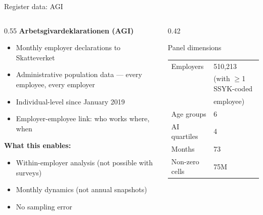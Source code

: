 \documentclass[aspectratio=169,11pt]{beamer}
\begin{document}
\begin{frame}{Register data: AGI}
\begin{columns}[T]
\begin{column}{0.55\textwidth}
\textbf{Arbetsgivardeklarationen (AGI)}
\begin{itemize}
    \item Monthly employer declarations to Skatteverket
    \item Administrative population data --- every employee, every employer
    \item Individual-level since January 2019
    \item Employer-employee link: who works where, when
\end{itemize}
\vspace{2mm}
\textbf{What this enables:}
\begin{itemize}
    \item Within-employer analysis (not possible with surveys)
    \item Monthly dynamics (not annual snapshots)
    \item No sampling error
\end{itemize}
\end{column}
\begin{column}{0.42\textwidth}
\begin{block}{Panel dimensions}
\footnotesize
\begin{tabular}{ll}
Employers & 510,213 \\
& {\tiny (with $\geq$1 SSYK-coded} \\
& {\tiny employee)} \\
Age groups & 6 \\
AI quartiles & 4 \\
Months & 73 \\
Non-zero cells & 75M \\
\end{tabular}
\end{block}
\end{column}
\end{columns}
\end{frame}
\end{document}

